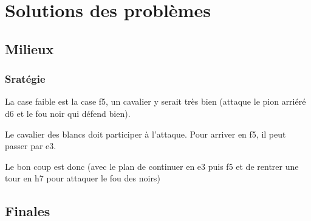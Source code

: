 
\chapter{Solutions des problèmes}



\section{Milieux}

\subsection{Sratégie}

\newgame
{}
\begin{minipage}{0.45\textwidth}
\hspace{0.7cm}La case faible est la case f5, un cavalier y serait très bien (attaque le pion arriéré d6 et le fou noir qui défend bien).
\vspace{0.25cm}

\hspace{0.7cm}Le cavalier des blancs doit participer à l'attaque. Pour arriver en f5, il peut passer par e3.

\vspace{0.25cm}
\hspace{0.7cm}Le bon coup est donc  (avec le plan de continuer en e3 puis f5 et de rentrer une tour en h7 pour attaquer le fou des noirs)

\end{minipage}
\hfill
\begin{minipage}{0.45\textwidth}
\chessboard[arrow=latex,
pgfstyle=straightmove,
color=red,
pgfstyle={[linewidth=2pt,arrow=to,style=knight]curvemove},
pgfstyle=curvemove,
shortenstart=-1ex,
]
\end{minipage}



\section{Finales}

